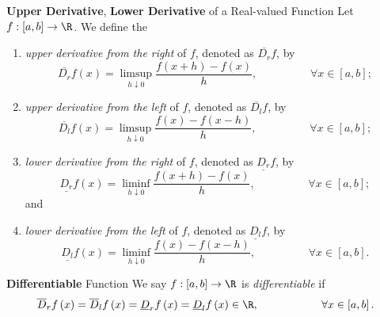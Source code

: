 \documentclass[pmath451]{subfiles}
\begin{document}
    \begin{definition}{\textbf{Upper Derivative}, \textbf{Lower Derivative} of a Real-valued Function}
        Let $f:\left[ a,b \right]\to\R$. We define the
        \begin{enumerate}
            \item \emph{upper derivative from the right} of $f$, denoted as $\overline{D_r}f$, by
                \begin{equation*}
                    \overline{D_r}f\left( x \right) = \limsup_{h\downarrow 0} \frac{f\left( x+h \right)-f\left( x \right)}{h}, \hspace{2cm}\forall x\in\left[ a,b \right];
                \end{equation*}
            \item \emph{upper derivative from the left} of $f$, denoted as $\overline{D_l}f$, by
                \begin{equation*}
                    \overline{D_l}f\left( x \right) = \limsup_{h\downarrow 0} \frac{f\left( x \right)-f\left( x-h \right)}{h}, \hspace{2cm}\forall x\in\left[ a,b \right];
                \end{equation*}
            \item \emph{lower derivative from the right} of $f$, denoted as $\underline{D_r}f$, by
                \begin{equation*}
                    \underline{D_r}f\left( x \right) = \liminf_{h\downarrow 0} \frac{f\left( x+h \right)-f\left( x \right)}{h}, \hspace{2cm}\forall x\in\left[ a,b \right];
                \end{equation*}
                and
            \item \emph{lower derivative from the left} of $f$, denoted as $\underline{D_l}f$, by
                \begin{equation*}
                    \underline{D_l}f\left( x \right) = \liminf_{h\downarrow 0} \frac{f\left( x \right)-f\left( x-h \right)}{h}, \hspace{2cm}\forall x\in\left[ a,b \right].
                \end{equation*}
        \end{enumerate}
    \end{definition}
    
    \begin{definition}{\textbf{Differentiable} Function}
        We say $f:\left[ a,b \right]\to\R$ is \emph{differentiable} if
        \begin{equation*}
            \overline{D}_rf\left( x \right) = \overline{D}_lf\left( x \right) = \underline{D}_rf\left( x \right) = \underline{D}_lf\left( x \right)\in\R , \hspace{2cm}\forall x\in\left[ a,b \right].
        \end{equation*}
    \end{definition}
    
\end{document}
